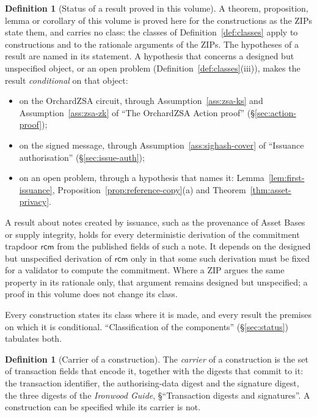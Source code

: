 \documentclass[11pt,a4paper]{article}
\theoremstyle{definition}
\newtheorem{definition}[theorem]{Definition}
\newcommand{\rcm}{\ensuremath{\mathsf{rcm}}}
\begin{document}
\begin{definition}[Status of a result proved in this volume]
\label{def:result-status}
A theorem, proposition, lemma or corollary of this volume is proved here
for the constructions as the ZIPs state them, and carries no class: the
classes of Definition~\ref{def:classes} apply to constructions and to the
rationale arguments of the ZIPs. The hypotheses of a result are named in
its statement. A hypothesis that concerns a designed but unspecified object,
or an open problem (Definition~\ref{def:classes}(iii)), makes the result
\emph{conditional} on that object:
\begin{itemize}
\item on the OrchardZSA circuit, through Assumption~\ref{ass:zsa-ks} and
  Assumption~\ref{ass:zsa-zk} of ``The OrchardZSA Action proof''
  (\S\ref{sec:action-proof});
\item on the signed message, through Assumption~\ref{ass:sighash-cover} of
  ``Issuance authorisation'' (\S\ref{sec:issue-auth});
\item on an open problem, through a hypothesis that names it:
  Lemma~\ref{lem:first-issuance}, Proposition~\ref{prop:reference-copy}(a)
  and Theorem~\ref{thm:asset-privacy}.
\end{itemize}
A result about notes created by issuance, such as the provenance of Asset
Bases or supply integrity, holds for every deterministic derivation of the
commitment trapdoor $\rcm$ from the published fields of such a note. It
depends on the designed but unspecified derivation of $\rcm$ only in that
some such derivation must be fixed for a validator to compute the
commitment. Where a ZIP argues the same property in its rationale only, that
argument remains designed but unspecified; a proof in this volume does not
change its class.
\end{definition}

Every construction states its class where it is made, and every result the
premises on which it is conditional. ``Classification of the components''
(\S\ref{sec:status}) tabulates both.

\begin{definition}[Carrier of a construction]\label{def:carrier}
The \emph{carrier} of a construction is the set of transaction fields that
encode it, together with the digests that commit to it: the transaction
identifier, the authorising-data digest and the signature digest, the three
digests of the \emph{Ironwood Guide}, \S``Transaction digests and
signatures''. A construction can be specified while its carrier is not.
\end{definition}
\end{document}
